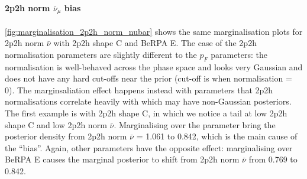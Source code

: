\paragraph{2p2h norm $\bar{\nu}_\mu$ bias}
\autoref{fig:marginalisation_2p2h_norm_nubar} shows the same marginalisation plots for 2p2h norm $\bar{\nu}$ with 2p2h shape C and BeRPA E. The case of the 2p2h normalisation parameters are slightly different to the $p_F$ parameters: the normalisation is well-behaved across the phase space and looks very Gaussian and does not have any hard cut-offs near the prior (cut-off is when normalisation = 0). The marginsaliation effect happens instead with parameters that 2p2h normalisations correlate heavily with which may have non-Gaussian posteriors. The first example is with 2p2h shape C, in which we notice a tail at low 2p2h shape C and low 2p2h norm $\bar{\nu}$. Marginalising over the parameter bring the posterior density from 2p2h norm $\bar{\nu}$ = 1.061 to 0.842, which is the main cause of the ``bias''. Again, other parameters have the opposite effect: marginalising over BeRPA E causes the marginal posterior to shift from 2p2h norm $\bar{\nu}$ from 0.769 to 0.842.
